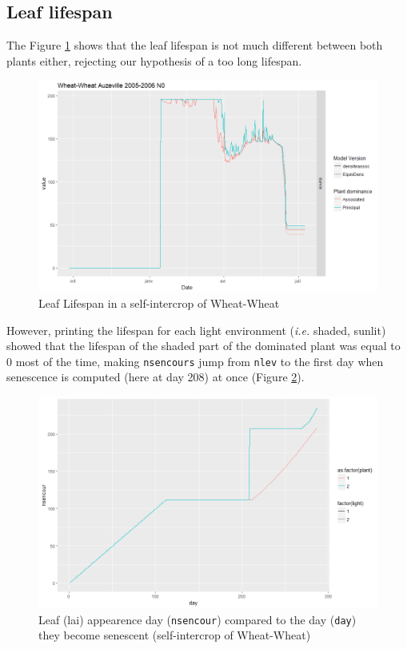 \documentclass[
]{book}
\begin{document}
\hypertarget{leaf-lifespan}{%
\subsection{Leaf lifespan}\label{leaf-lifespan}}

The Figure \ref{fig:Durvie} shows that the leaf lifespan is not much different between both plants either, rejecting our hypothesis of a too long lifespan.

\begin{figure}
\centering
\includegraphics{img/Durvie.png}
\caption{\label{fig:Durvie}Leaf Lifespan in a self-intercrop of Wheat-Wheat}
\end{figure}

However, printing the lifespan for each light environment (\emph{i.e.} shaded, sunlit) showed that the lifespan of the shaded part of the dominated plant was equal to 0 most of the time, making \texttt{nsencours} jump from \texttt{nlev} to the first day when senescence is computed (here at day 208) at once (Figure \ref{fig:nsencour}).

\begin{figure}
\centering
\includegraphics{img/LAIhigh_nsencour.png}
\caption{\label{fig:nsencour}Leaf (lai) appearence day (\texttt{nsencour}) compared to the day (\texttt{day}) they become senescent (self-intercrop of Wheat-Wheat)}
\end{figure}
\end{document}
